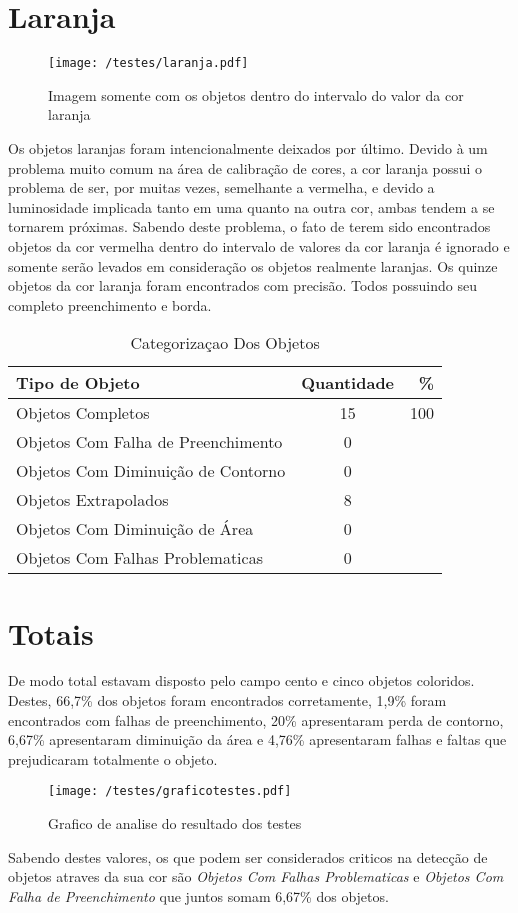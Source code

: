 \section{Laranja}
	\begin{figure}[H]
		\centering
		\texttt{[image: /testes/laranja.pdf]}
		\caption{Imagem somente com os objetos dentro do intervalo do valor da cor laranja}
		\label{disposicaoparte}
	\end{figure}
	
	Os objetos laranjas foram intencionalmente deixados por último.
	Devido à um problema muito comum na área de calibração de cores, a cor laranja possui o problema de ser, por muitas vezes, semelhante a vermelha, e devido a luminosidade implicada tanto em uma quanto na outra cor, ambas tendem a se tornarem próximas.
	Sabendo deste problema, o fato de terem sido encontrados objetos da cor vermelha dentro do intervalo de valores da cor laranja é ignorado e somente serão levados em consideração os objetos realmente laranjas.
	Os quinze objetos da cor laranja foram encontrados com precisão. Todos possuindo seu completo preenchimento e borda.
	
\begin{table}[h]
\centering
\begin{tabular}{l|c|r}
Tipo de Objeto & Quantidade  & \% \\ %
\hline                               %
Objetos Completos &  15 & 100 \\
\hline 
Objetos Com Falha de Preenchimento & 0 \\
\hline 
Objetos Com Diminuição de Contorno &  0 \\
\hline 
Objetos Extrapolados & 8 \\
\hline 
Objetos Com Diminuição de Área &  0 \\
\hline 
Objetos Com Falhas Problematicas & 0 \\
\hline 
\end{tabular}
\caption{Categorizaçao Dos Objetos}
\end{table}
\newpage
\section{Totais}
De modo total estavam disposto pelo campo cento e cinco objetos coloridos. Destes, 66,7\% dos objetos foram encontrados corretamente, 1,9\% foram encontrados com falhas de preenchimento, 20\% apresentaram perda de contorno, 6,67\% apresentaram diminuição da área e 4,76\% apresentaram falhas e faltas que prejudicaram totalmente o objeto.
	\begin{figure}[H]
		\centering
		\texttt{[image: /testes/graficotestes.pdf]}
		\caption{Grafico de analise do resultado dos testes}
		\label{disposicaoparte}
	\end{figure}
	
	
	Sabendo destes valores, os que podem ser considerados criticos na detecção de objetos atraves da sua cor são \textit{Objetos Com Falhas Problematicas} e \textit{Objetos Com Falha de Preenchimento} que juntos somam 6,67\% dos objetos.